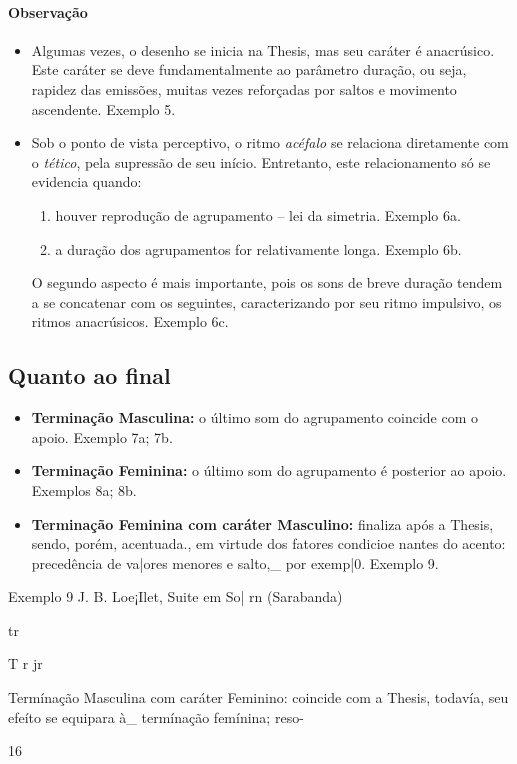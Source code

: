 \documentclass[a4paper]{book}
\begin{document}
\paragraph*{Observação}

\begin{itemize}
\item Algumas vezes, o desenho se inicia na Thesis, mas seu caráter é anacrúsico. Este caráter se deve fundamentalmente ao parâmetro duração, ou seja, rapidez das emissões, muitas vezes reforçadas por saltos e movimento ascendente. Exemplo 5.
\item Sob o ponto de vista perceptivo, o ritmo \emph{acéfalo} se relaciona diretamente com o \emph{tético}, pela supressão de seu início. Entretanto, este relacionamento só se evidencia quando:
\begin{enumerate}
\item houver reprodução de agrupamento -- lei da simetria. Exemplo 6a.
\item a duração dos agrupamentos for relativamente longa. Exemplo 6b.
\end{enumerate}
O segundo aspecto é mais importante, pois os sons de breve duração tendem a se concatenar com os seguintes, caracterizando por seu ritmo impulsivo, os ritmos anacrúsicos. Exemplo 6c.
\end{itemize} 

\subsection*{Quanto ao final}
\begin{itemize}
\item \textbf{Terminação Masculina:} o último som do agrupamento coincide com o apoio. Exemplo 7a; 7b.
\item \textbf{Terminação Feminina:} o último som do agrupamento é posterior ao apoio. Exemplos 8a; 8b.
\item \textbf{Terminação Feminina com caráter Masculino:} finaliza após a Thesis, sendo, porém, acentuada., em virtude dos fatores condicioe nantes do acento: precedência de va|ores menores e salto,_ por exemp|0. Exemplo 9.
\end{itemize}

Exemplo 9
J. B. Loe¡Ilet, Suite em So| rn (Sarabanda)

tr

    

T r jr

Termínação Masculina com caráter Feminino: coincide com a
Thesis, todavía, seu efeíto se equipara à_ termínação femínina; reso-

16



\end{document}
